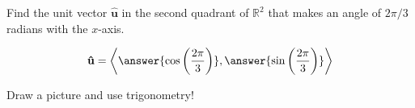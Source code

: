 \documentclass{ximera}
\author{Gregory Hartman \and Matthew Carr}
\begin{document}
\begin{exercise}
Find the unit vector $\mathbf{\hat{u}}$ in the second quadrant of $\mathbb{R}^2$ that
makes an angle of $2\pi/3$ radians with the $x$-axis.
\begin{prompt}
\[
\mathbf{\hat{u}} = \left\langle \answer{\cos\left(\frac{2\pi}{3}\right)},\answer{\sin\left(\frac{2\pi}{3}\right)} \right\rangle
\]

\begin{hint}
Draw a picture and use trigonometry!
\end{hint}
\end{prompt}

\end{exercise}
\end{document}
